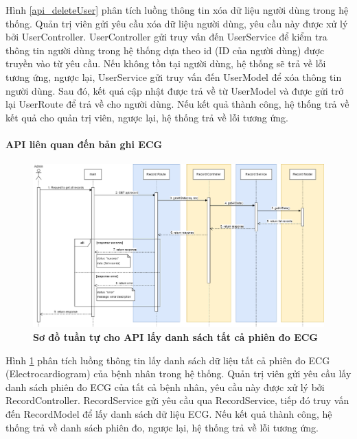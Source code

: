 Hình \ref{api_deleteUser} phân tích luồng thông tin xóa dữ liệu người dùng trong hệ thống. Quản trị viên gửi yêu cầu xóa dữ liệu người dùng, 
yêu cầu này được xử lý bởi UserController. UserController gửi truy vấn đến UserService để kiểm tra thông tin người dùng trong hệ thống dựa theo id (ID của người dùng) được truyền vào từ yêu cầu. 
Nếu không tồn tại người dùng, hệ thống sẽ trả về lỗi tương ứng, ngược lại, UserService gửi truy vấn đến UserModel để xóa thông tin người dùng. Sau đó, kết quả cập nhật được trả về 
từ UserModel và được gửi trở lại UserRoute để trả về cho người dùng. Nếu kết quả thành công, hệ thống trả về kết quả cho quản trị viên, ngược lại, hệ thống trả về lỗi tương ứng.



\paragraph{API liên quan đến bản ghi ECG}
\mbox{}

\begin{figure}[H]
  \centering
  \includegraphics[scale=0.35]{Images/sequence_api/getAllRecord.png}
  \caption[Sơ đồ tuần tự cho API lấy danh sách tất cả phiên đo ECG ]{\bfseries \fontsize{12pt}{0pt}
  \selectfont Sơ đồ tuần tự cho API lấy danh sách tất cả phiên đo ECG }
  \label{api_getAllEcgRecords} %
\end{figure}
Hình \ref{api_getAllEcgRecords} phân tích luồng thông tin lấy danh sách dữ liệu tất cả phiên đo ECG (Electrocardiogram) của bệnh nhân trong hệ thống. Quản trị viên gửi yêu cầu lấy danh sách phiên đo ECG của tất cả bệnh nhân, 
yêu cầu này được xử lý bởi RecordController. RecordService gửi yêu cầu qua RecordService, tiếp đó truy vấn đến RecordModel để lấy danh sách dữ liệu ECG. Nếu kết quả thành công, hệ thống trả về danh sách phiên đo, 
ngược lại, hệ thống trả về lỗi tương ứng.


